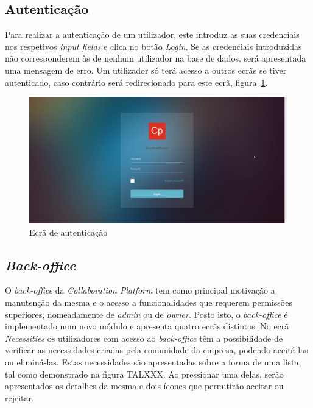 \subsection{Autenticação}\label{subsec:implementacao:login}

Para realizar a autenticação de um utilizador, este introduz as suas credenciais nos respetivos \textit{input fields} e clica no botão \textit{Login}.
Se as credenciais introduzidas não corresponderem às de nenhum utilizador na base de dados, será apresentada uma mensagem de erro.
Um utilizador só terá acesso a outros ecrãs se tiver autenticado, caso contrário será redirecionado para este ecrã, figura~\ref{fig:LoginScreen}.

\begin{figure}[H]
  \centering 
  \includegraphics[scale=0.35]{figures/LoginScreen.png}
  \caption{Ecrã de autenticação}\label{fig:LoginScreen}
\end{figure}

\subsection{\textit{Back-office}}\label{subsec:implementacao:back-office}

O \textit{back-office} da \textit{Collaboration Platform} tem como principal motivação a manutenção da mesma e o acesso a funcionalidades que requerem permissões superiores, nomeadamente de \textit{admin} ou de \textit{owner}.
Posto isto, o \textit{back-office} é implementado num novo módulo e apresenta quatro ecrãs distintos. 
No ecrã \textit{Necessities} os utilizadores com acesso ao \textit{back-office} têm a possibilidade de verificar as necessidades criadas pela comunidade da empresa, podendo aceitá-las ou eliminá-las. 
Estas necessidades são apresentadas sobre a forma de uma lista, tal como demonstrado na figura TALXXX. Ao pressionar uma delas, serão apresentados os detalhes da mesma e dois ícones que permitirão aceitar ou rejeitar. 


